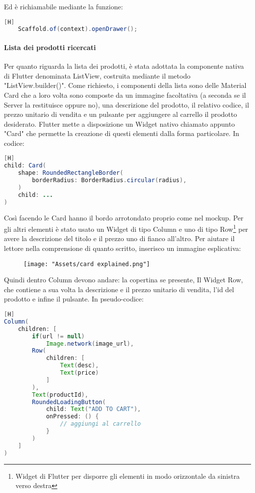 \noindent
Ed è richiamabile mediante la funzione:
\begin{lstlisting}[language=Java, firstnumber=1][H]
	Scaffold.of(context).openDrawer();
\end{lstlisting}

\noindent
\paragraph{Lista dei prodotti ricercati} \label{par:listview}
Per quanto riguarda la lista dei prodotti, è stata adottata la componente nativa di Flutter denominata ListView, costruita mediante il metodo "ListView.builder()".
Come richiesto, i componenti della lista sono delle Material Card che a loro volta sono composte da un immagine facoltativa (a seconda se il Server la restituisce oppure no), una descrizione del prodotto, il relativo codice, il prezzo unitario di vendita e un pulsante per aggiungere al carrello il prodotto desiderato. Flutter mette a disposizione un Widget nativo chiamato appunto "Card" che permette la creazione di questi elementi dalla forma particolare. In codice:
\begin{lstlisting}[language=Java, firstnumber=1][H]
child: Card(
	shape: RoundedRectangleBorder(
		borderRadius: BorderRadius.circular(radius),
	)
	child: ...
)
\end{lstlisting}

\noindent
Così facendo le Card hanno il bordo arrotondato proprio come nel mockup. Per gli altri elementi è stato usato un Widget di tipo Column e uno di tipo Row\footnote{Widget di Flutter per disporre gli elementi in modo orizzontale da sinistra verso destra} per avere la descrizione del titolo e il prezzo uno di fianco all'altro. Per aiutare il lettore nella comprensione di quanto scritto, inserisco un immagine esplicativa:
\begin{figure}[H]
\centering
	\begin{minipage}[t]{0.45\linewidth}
		\texttt{[image: "Assets/card explained.png"]}
	\end{minipage}
\end{figure}
Quindi dentro Column devono andare: la copertina se presente, Il Widget Row, che contiene a sua volta la descrizione e il prezzo unitario di vendita, l'id del prodotto e infine il pulsante. In pseudo-codice:
\begin{lstlisting}[language=Java][H]
Column(
	children: [
		if(url != null)
			Image.network(image_url),
		Row(
			children: [
				Text(desc),
				Text(price)
			]
		),
		Text(productId),
		RoundedLoadingButton(
			child: Text("ADD TO CART"),
			onPressed: () {
				// aggiungi al carrello
			}
		)
	]
)
\end{lstlisting}


